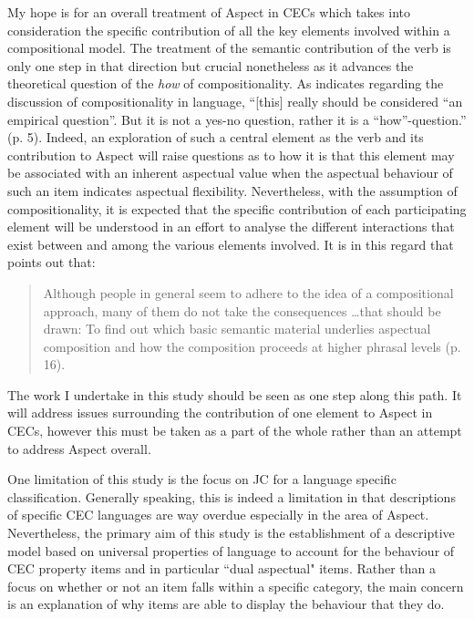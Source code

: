 My hope is for an overall treatment of Aspect in CECs which takes into
consideration the specific contribution of all the key elements
involved within a compositional model.  The treatment of the semantic
contribution of the verb is only one step in that direction but
crucial nonetheless as it advances the theoretical question of the
\textit{how} of compositionality.  As \citet{Dowty2006} indicates
regarding the discussion of compositionality in language, ``[this]
really should be considered ``an empirical question''.  But it is not a
yes-no question, rather it is a ``how''-question.'' (p. 5).  Indeed, an
exploration of such a central element as the verb and its contribution
to Aspect will raise questions as to how it is that this element may
be associated with an inherent aspectual value when the aspectual
behaviour of such an item indicates aspectual flexibility.
Nevertheless, with the assumption of compositionality, it is expected
that the specific contribution of each participating element will be
understood in an effort to analyse the different interactions that
exist between and among the various elements involved.  It is in this
regard that \citet{Verkuyl1999} points out that:

\begin{quote}
Although people in general seem to adhere to the idea of a
compositional approach, many of them do not take the consequences
…that should be drawn: To find out which basic semantic material
underlies aspectual composition and how the composition proceeds at
higher phrasal levels (p. 16).
\end{quote}

The work I undertake in this study should be seen as one step along
this path.  It will address issues surrounding the contribution of one
element to Aspect in CECs, however this must be taken as a part of the
whole rather than an attempt to address Aspect overall.

One limitation of this study is the focus on JC for a language
specific classification.  Generally speaking, this is indeed a
limitation in that descriptions of specific CEC languages are way
overdue especially in the area of Aspect.  Nevertheless, the primary
aim of this study is the establishment of a descriptive model based
on universal properties of language to account for the behaviour of
CEC property items and in particular ``dual aspectual" items.  Rather
than a focus on whether or not an item falls within a specific
category, the main concern is an explanation of why items are able to
display the behaviour that they do.

